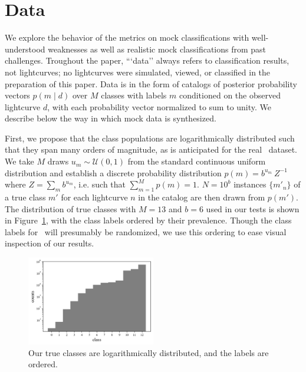 \section{Data}
\label{sec:data}

We explore the behavior of the metrics on mock classifications with well-understood weaknesses as well as realistic mock classifications from past challenges.
Troughout the paper, ```data'' always refers to classification results, not lightcurves; no lightcurves were simulated, viewed, or classified in the preparation of this paper.
Data is in the form of catalogs of posterior probability vectors $p(m \mid d)$ over $M$ classes with labels $m$ conditioned on the observed lightcurve $d$, with each probability vector normalized to sum to unity.
We describe below the way in which mock data is synthesized.

First, we propose that the class populations are logarithmically distributed such that they span many orders of magnitude, as is anticipated for the real \lsst\ dataset.
We take $M$ draws $u_{m} \sim \mathcal{U}(0, 1)$ from the standard continuous uniform distribution and establish a discrete probability distribution $p(m) = b^{u_{m}}\ Z^{-1}$ where $Z = \sum_{m} b^{u_{m}}$, i.e. such that $\sum_{m=1}^{M} p(m) = 1$.
$N = 10^{b}$ instances $\{m'_{n}\}$ of a true class $m'$ for each lightcurve $n$ in the catalog are then drawn from $p(m')$.
The distribution of true classes with $M = 13$ and $b = 6$ used in our tests is shown in Figure~\ref{fig:classdist}, with the class labels ordered by their prevalence.
Though the class labels for \plasticc\ will presumably be randomized, we use this ordering to ease visual inspection of our results.

\begin{figure}
	\begin{center}
    \includegraphics[width=0.5\textwidth]{./fig/complete_counts.png}
		\caption{Our true classes are logarithmically distributed, and the labels are ordered.}
		\label{fig:classdist}
	\end{center}
\end{figure}

